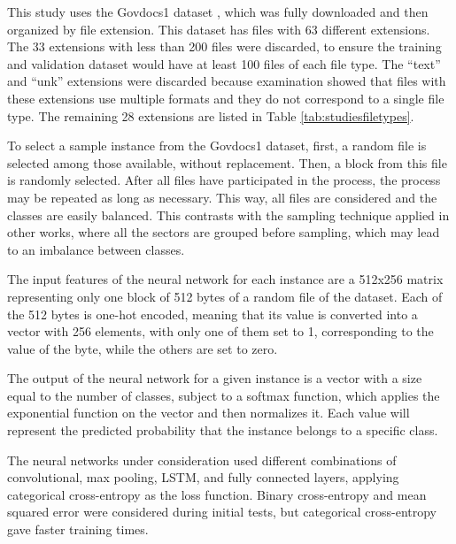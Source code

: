 

This study uses the Govdocs1 dataset \cite{garfinkel_bringing_2009}, which was fully downloaded and then organized by file extension.
This dataset has files with 63 different extensions. The 33 extensions with less than 200 files were discarded, to ensure the training and validation dataset would have at least 100 files of each file type.
The  ``text'' and ``unk'' extensions were discarded because examination showed that files with these extensions use multiple formats and they do not correspond to a single file type.
The remaining 28 extensions are listed in Table \ref{tab:studiesfiletypes}.

To select a sample instance from the Govdocs1 dataset, first, a random file is selected among those available, without replacement. Then, a block from this file is randomly selected. After all files have participated in the process, the process may be repeated as long as necessary. This way, all files are considered and the classes are easily balanced.
This contrasts with the sampling technique applied in other works, where all the sectors are grouped before sampling, which may lead to an imbalance between classes.

The input features of the neural network for each instance are a 512x256 matrix representing only one block of 512 bytes of a random file of the dataset. Each of the 512 bytes is one-hot encoded, meaning that its value is converted into a vector with 256 elements, with only one of them set to 1, corresponding to the value of the byte, while the others are set to zero.

The output of the neural network for a given instance is a vector with a size equal to the number of classes, subject to a softmax function, which applies the exponential function on the vector and then normalizes it. Each value will represent the predicted probability that the instance belongs to a specific class.

The neural networks under consideration used different combinations of convolutional, max pooling, LSTM, and fully connected layers, applying categorical cross-entropy as the loss function. Binary cross-entropy and mean squared error were considered during initial tests, but categorical cross-entropy gave faster training times.


